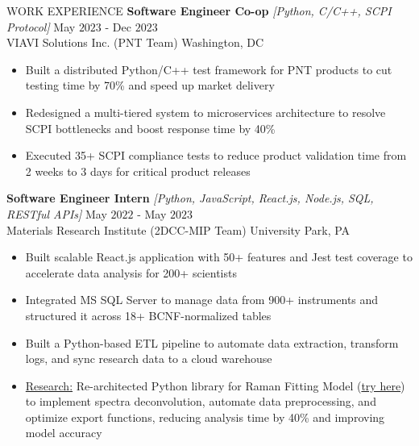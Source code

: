 \documentclass{resume} %
\begin{document}
\begin{rSection}{WORK EXPERIENCE}
{\bf Software Engineer Co-op} \textit{[Python, C/C++, SCPI Protocol]} \hfill May $2023$ - Dec $2023$\\
VIAVI Solutions Inc. (PNT Team) \hfill Washington, DC
\begin{itemize}[itemsep = -4pt]
    \item Built a distributed Python/C++ test framework for PNT products to cut testing time by 70\% and speed up market delivery
    \item Redesigned a multi-tiered system to microservices architecture to resolve SCPI bottlenecks and boost response time by 40\%
    \item Executed 35+ SCPI compliance tests to reduce product validation time from 2 weeks to 3 days for critical product releases
\end{itemize}

{\bf Software Engineer Intern} \textit{[Python, JavaScript, React.js, Node.js, SQL, RESTful APIs]} \hfill May $2022$ - May $2023$\\
Materials Research Institute (2DCC-MIP Team) \hfill University Park, PA
\begin{itemize}[itemsep = -4pt]
    \item Built scalable React.js application with 50+ features and Jest test coverage to accelerate data analysis for 200+ scientists
    \item Integrated MS SQL Server to manage data from 900+ instruments and structured it across 18+ BCNF-normalized tables
    \item Built a Python-based ETL pipeline to automate data extraction, transform logs, and sync research data to a cloud warehouse
    \item \underline{Research:} Re-architected Python library for Raman Fitting Model ({\href{https://github.com/harshitjain17/Raman-Peak-Fitting-Model/}{try here}}) to implement spectra deconvolution, automate data preprocessing, and optimize export functions, reducing analysis time by 40\% and improving model accuracy
\end{itemize}

\end{rSection} 
\end{document}
